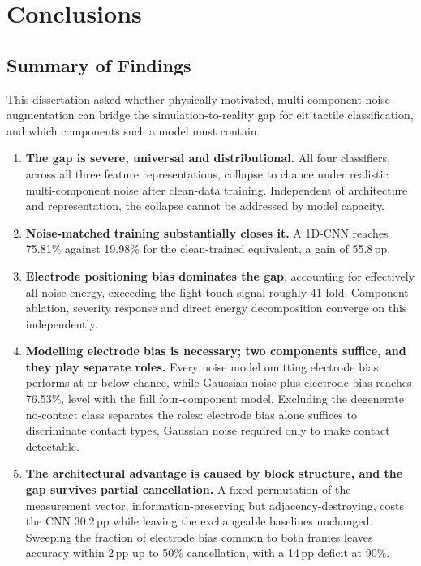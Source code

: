 \chapter{Conclusions}
\label{ch:conclusions}

\section{Summary of Findings}
\label{sec:conc-summary}

This dissertation asked whether physically motivated, multi-component noise augmentation can bridge the simulation-to-reality gap for \gls{eit} tactile classification, and which components such a model must contain.

\begin{enumerate}
    \item \textbf{The gap is severe, universal and distributional.} All four classifiers, across all three feature representations, collapse to chance under realistic multi-component noise after clean-data training. Independent of architecture and representation, the collapse cannot be addressed by model capacity.

    \item \textbf{Noise-matched training substantially closes it.} A 1D-CNN reaches 75.81\% against 19.98\% for the clean-trained equivalent, a gain of 55.8\,pp.

    \item \textbf{Electrode positioning bias dominates the gap}, accounting for effectively all noise energy, exceeding the light-touch signal roughly 41-fold. Component ablation, severity response and direct energy decomposition converge on this independently.

    \item \textbf{Modelling electrode bias is necessary; two components suffice, and they play separate roles.} Every noise model omitting electrode bias performs at or below chance, while Gaussian noise plus electrode bias reaches 76.53\%, level with the full four-component model. Excluding the degenerate no-contact class separates the roles: electrode bias alone suffices to discriminate contact types, Gaussian noise required only to make contact detectable.


\item \textbf{The architectural advantage is caused by block structure, and the gap survives partial cancellation.} A fixed permutation of the measurement vector, information-preserving but adjacency-destroying, costs the CNN 30.2\,pp while leaving the exchangeable baselines unchanged. Sweeping the fraction of electrode bias common to both frames leaves accuracy within 2\,pp up to 50\% cancellation, with a 14\,pp deficit at 90\%.



\end{enumerate}
